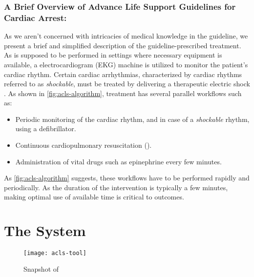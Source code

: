 \subsubsection{A Brief Overview of Advance Life Support Guidelines for Cardiac Arrest:}

As we aren't concerned with intricacies of medical knowledge in the guideline,
we present a brief and simplified description of the guideline-prescribed treatment.
As \ALS{} is supposed to be performed in settings where necessary equipment is
available, a electrocardiogram (EKG) machine is utilized to
monitor the patient's cardiac rhythm. Certain cardiac arrhythmias, characterized
by cardiac rhythms referred to as \emph{shockable}, must be treated
by delivering a therapeutic electric shock
\cite{DefibrillationWikiEntry}. As shown in \autoref{fig:acls-algorithm},
treatment has several parallel workflows such as:
\begin{itemize}
  \item Periodic monitoring of the cardiac rhythm, and in case of a
    \emph{shockable} rhythm, using a defibrillator.
  \item Continuous cardiopulmonary resuscitation (\CPR{}).
  \item Administration of vital drugs such as
    epinephrine every few minutes.
\end{itemize}
As \autoref{fig:acls-algorithm} suggests, these workflows have to be
performed rapidly and periodically. As the duration of the intervention
is typically a few minutes, making optimal use of available time is critical to
outcomes.

\section{The \KACLS{} System}\label{sec:kacls-cdss}

\begin{figure}[t!]
  \centering
  \texttt{[image: acls-tool]}
  \caption{Snapshot of \KACLS{}}\label{fig:kacls-snapshot}
\end{figure}

